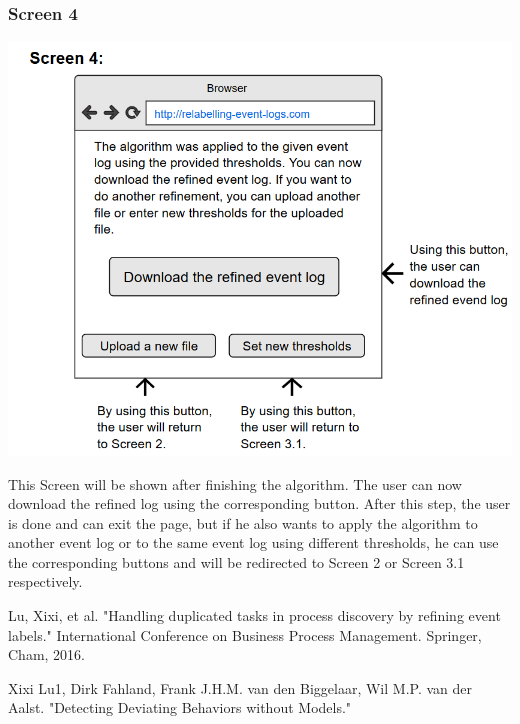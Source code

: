 \documentclass[notitlepage]{article}
\begin{document}
\begin{flushleft}
\subsubsection{Screen 4}
\includegraphics[scale=0.8]{InterfaceMockup4.png}

This Screen will be shown after finishing the algorithm. The user can now download the refined log using the corresponding button. After this step, the user is done and can exit the page, but if he also wants to apply the algorithm to another event log or to the same event log using different thresholds, he can use the corresponding buttons and will be redirected to Screen 2 or Screen 3.1 respectively.


%
%  




\end{flushleft}
%



\begin{thebibliography}{5}
Lu, Xixi, et al. "Handling duplicated tasks in process discovery by refining event labels." International Conference on Business Process Management. Springer, Cham, 2016.

Xixi Lu1, Dirk Fahland, Frank J.H.M. van den Biggelaar, Wil M.P. van der Aalst. "Detecting Deviating Behaviors without Models."


\end{thebibliography}
\end{document}
